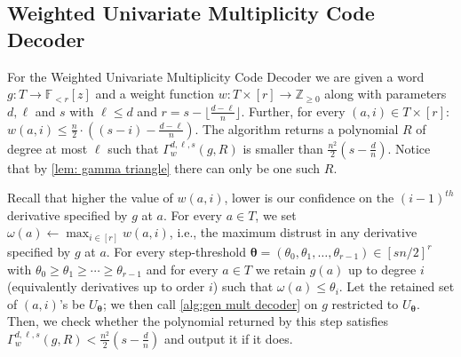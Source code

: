 \documentclass{article}
\def\Integer{\mathbb{Z}}
\def\Field{\mathbb{F}}
\let\Z\Integer
\let\F\Field
\newcommand{\thetabar}{{\boldsymbol{\theta}}}
\begin{document}
	
	
	
	\subsection{Weighted Univariate Multiplicity Code Decoder}
	
	For the Weighted Univariate Multiplicity Code Decoder we are given a word $g\colon T \to \F_{<r}[z]$ and a weight function $w\colon T\times [r]\to \Z_{\geq 0}$ along with parameters $d,\ell$ and $s$ with $\ell \leq d$ and $r = s - \lfloor \frac{d-\ell}{n} \rfloor $. Further, for every $(a, i) \in T \times [r]$: $w(a,i) \leq \frac{n}{2}\cdot\left((s-i) - \frac{d-\ell}n\right)$.
	The algorithm returns a polynomial $R$ of degree at most $\ell$ such
	that $\Gamma_w^{d, \ell, s}(g, R) $ is smaller than
	$\frac{n^2}{2}(s-\frac{d}{n})$. Notice that by \cref{lem: gamma
		triangle} there can only be one such $R$. 
	
	Recall that higher the value of $w(a,i)$, lower is our confidence on the $(i-1)^{th}$ derivative specified by $g$ at $a$. 
	For every $a\in T$, we set  $ \omega(a) \gets \max_{i \in [r]} w(a, i)$, i.e., the maximum distrust in any derivative specified by $g$ at $a$.
	For every step-threshold $\thetabar = (\theta_0, \theta_1, \ldots,
	\theta_{r-1}) \in [sn/2]^r$ with $\theta_0 \geq \theta_1 \geq \dotsb
	\geq \theta_{r-1}$ and for every $a\in T$  we retain $g(a)$ up to
	degree $i$ (equivalently derivatives up to order $i$) such that
	$\omega(a)\leq \theta_i$. Let the retained set of $(a,i)$'s be
	$U_{\thetabar}$; we then call \cref{alg:gen mult decoder} on $g$
	restricted to $U_{\thetabar}$. Then, we check whether the polynomial
	returned by this  step satisfies $\Gamma_w^{d, \ell, s}(g, R) < \frac{n^2}{2}(s-\frac{d}{n})$ and output it if it does.\\
	
\end{document}
